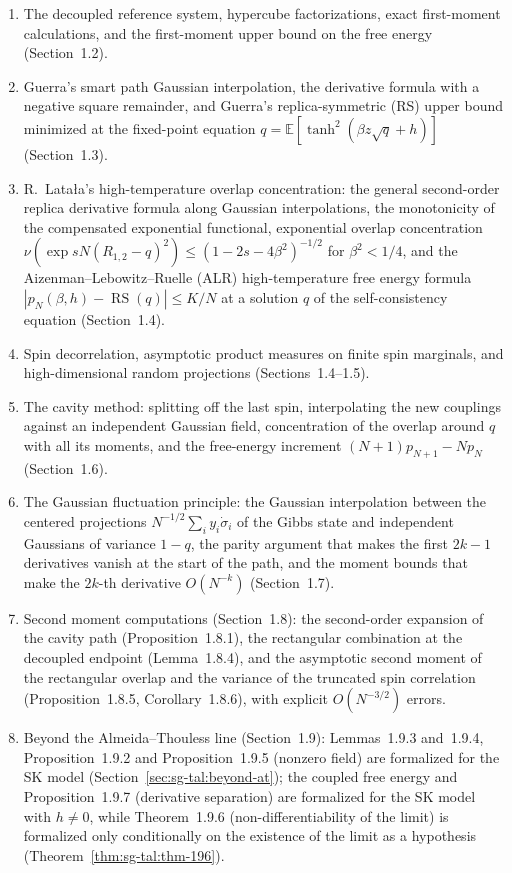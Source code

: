 \begin{enumerate}
\item The decoupled reference system, hypercube factorizations, exact first-moment calculations, and the first-moment upper bound on the free energy (Section~1.2).
\item Guerra's smart path Gaussian interpolation, the derivative formula with a negative square remainder, and Guerra's replica-symmetric (RS) upper bound minimized at the fixed-point equation $q = \mathbb{E}[\tanh^2(\beta z \sqrt{q} + h)]$ (Section~1.3).
\item R.~Lata\l{}a's high-temperature overlap concentration: the general second-order replica derivative formula along Gaussian interpolations, the monotonicity of the compensated exponential functional, exponential overlap concentration $\nu(\exp s N (R_{1,2} - q)^2) \le (1 - 2s - 4\beta^2)^{-1/2}$ for $\beta^2 < 1/4$, and the Aizenman--Lebowitz--Ruelle (ALR) high-temperature free energy formula $|p_N(\beta, h) - \operatorname{RS}(q)| \le K/N$ at a solution $q$ of the self-consistency equation (Section~1.4).
\item Spin decorrelation, asymptotic product measures on finite spin marginals, and high-dimensional random projections (Sections~1.4--1.5).
\item The cavity method: splitting off the last spin, interpolating the new couplings against an independent Gaussian field, concentration of the overlap around $q$ with all its moments, and the free-energy increment $(N+1)p_{N+1}-Np_N$ (Section~1.6).
\item The Gaussian fluctuation principle: the Gaussian interpolation between the centered projections $N^{-1/2}\sum_i y_i\dot\sigma_i$ of the Gibbs state and independent Gaussians of variance $1-q$, the parity argument that makes the first $2k-1$ derivatives vanish at the start of the path, and the moment bounds that make the $2k$-th derivative $O(N^{-k})$ (Section~1.7).
\item Second moment computations (Section~1.8): the second-order expansion of the cavity path (Proposition~1.8.1), the rectangular combination at the decoupled endpoint (Lemma~1.8.4), and the asymptotic second moment of the rectangular overlap and the variance of the truncated spin correlation (Proposition~1.8.5, Corollary~1.8.6), with explicit $O(N^{-3/2})$ errors.
\item Beyond the Almeida--Thouless line (Section~1.9): Lemmas~1.9.3 and~1.9.4, Proposition~1.9.2 and Proposition~1.9.5 (nonzero field) are formalized for the SK model (Section~\ref{sec:sg-tal:beyond-at}); the coupled free energy and Proposition~1.9.7 (derivative separation) are formalized for the SK model with $h\ne0$, while Theorem~1.9.6 (non-differentiability of the limit) is formalized only conditionally on the existence of the limit as a hypothesis (Theorem~\ref{thm:sg-tal:thm-196}).

\end{enumerate}
